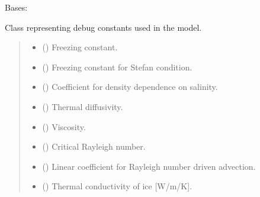 \documentclass[a4paper,11pt,english,openany]{sphinxmanual}
\begin{document}
\begin{fulllineitems}
\label{\detokenize{api/spyice.parameters.debug_constants:src.spyice.parameters.debug_constants.DebugConstants}}
\pysigstartsignatures
\pysigline
{}
\pysigstopsignatures
\sphinxAtStartPar
Bases: 

\sphinxAtStartPar
Class representing debug constants used in the model.
\begin{quote}\begin{description}
\begin{itemize}
\item {} 
\sphinxAtStartPar
{} () \textendash{} Freezing constant.

\item {} 
\sphinxAtStartPar
{} () \textendash{} Freezing constant for Stefan condition.

\item {} 
\sphinxAtStartPar
{} () \textendash{} Coefficient for density dependence on salinity.

\item {} 
\sphinxAtStartPar
{} () \textendash{} Thermal diffusivity.

\item {} 
\sphinxAtStartPar
{} () \textendash{} Viscosity.

\item {} 
\sphinxAtStartPar
{} () \textendash{} Critical Rayleigh number.

\item {} 
\sphinxAtStartPar
{} () \textendash{} Linear coefficient for Rayleigh number driven advection.

\item {} 
\sphinxAtStartPar
{} () \textendash{} Thermal conductivity of ice {[}W/m/K{]}.


\end{itemize}
\end{description}
\end{quote}
\end{fulllineitems}
\end{document}
